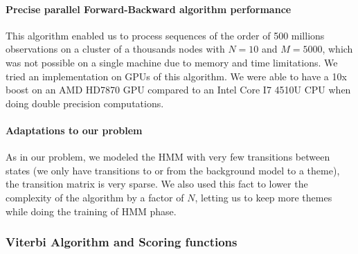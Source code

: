 \paragraph{Precise parallel Forward-Backward algorithm performance}
This algorithm enabled us to process sequences of the order of 500 millions observations on a cluster of a thousands nodes with $N=10$ and $M=5000$, which was not possible on a single machine due to memory and time limitations.
We tried an implementation on GPUs of this algorithm. We were able to have a 10x boost on an AMD HD7870 GPU compared to an Intel Core I7 4510U CPU when doing double precision computations.

\paragraph{Adaptations to our problem}
As in our problem, we modeled the HMM with very few transitions between states (we only have transitions to or from the background model to a theme), the transition matrix is very sparse. We also used this fact to lower the complexity of the algorithm by a factor of $N$, letting us to keep more themes while doing the training of HMM phase.

\subsubsection{Viterbi Algorithm and Scoring functions}


